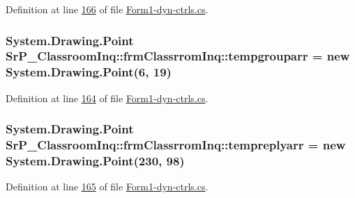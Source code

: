 \-Definition at line \hyperlink{_form1-dyn-ctrls_8cs_source_l00166}{166} of file \hyperlink{_form1-dyn-ctrls_8cs_source}{\-Form1-\/dyn-\/ctrls.\-cs}.

\hypertarget{class_sr_p___classroom_inq_1_1frm_classrrom_inq_a6c8231644b9d1f92d08f110b003d621e}{
\subsubsection[{tempgrouparr}]{\setlength{\rightskip}{0pt plus 5cm}\-System.\-Drawing.\-Point {\bf \-Sr\-P\-\_\-\-Classroom\-Inq\-::frm\-Classrrom\-Inq\-::tempgrouparr} = new \-System.\-Drawing.\-Point(6, 19)}}
\label{class_sr_p___classroom_inq_1_1frm_classrrom_inq_a6c8231644b9d1f92d08f110b003d621e}


\-Definition at line \hyperlink{_form1-dyn-ctrls_8cs_source_l00164}{164} of file \hyperlink{_form1-dyn-ctrls_8cs_source}{\-Form1-\/dyn-\/ctrls.\-cs}.

\hypertarget{class_sr_p___classroom_inq_1_1frm_classrrom_inq_ac6007ba00a6fab2fca4b74c0e588e850}{
\subsubsection[{tempreplyarr}]{\setlength{\rightskip}{0pt plus 5cm}\-System.\-Drawing.\-Point {\bf \-Sr\-P\-\_\-\-Classroom\-Inq\-::frm\-Classrrom\-Inq\-::tempreplyarr} = new \-System.\-Drawing.\-Point(230, 98)}}
\label{class_sr_p___classroom_inq_1_1frm_classrrom_inq_ac6007ba00a6fab2fca4b74c0e588e850}


\-Definition at line \hyperlink{_form1-dyn-ctrls_8cs_source_l00165}{165} of file \hyperlink{_form1-dyn-ctrls_8cs_source}{\-Form1-\/dyn-\/ctrls.\-cs}.

